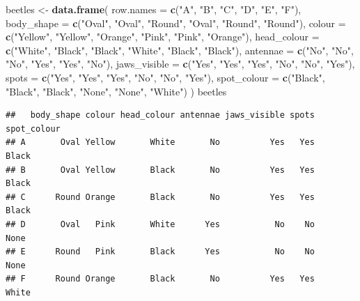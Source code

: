 \documentclass[
  a4paper]{book}
\newenvironment{Shaded}{\begin{snugshade}}{\end{snugshade}}
\newcommand{\AttributeTok}[1]{\textcolor[rgb]{0.13,0.29,0.53}{#1}}
\newcommand{\FunctionTok}[1]{\textcolor[rgb]{0.13,0.29,0.53}{\textbf{#1}}}
\newcommand{\NormalTok}[1]{#1}
\newcommand{\OtherTok}[1]{\textcolor[rgb]{0.56,0.35,0.01}{#1}}
\newcommand{\StringTok}[1]{\textcolor[rgb]{0.31,0.60,0.02}{#1}}
\begin{document}
\begin{Shaded}
\begin{Highlighting}[]
\NormalTok{beetles }\OtherTok{\textless{}{-}} \FunctionTok{data.frame}\NormalTok{(}
  \AttributeTok{row.names    =} \FunctionTok{c}\NormalTok{(}\StringTok{"A"}\NormalTok{, }\StringTok{"B"}\NormalTok{, }\StringTok{"C"}\NormalTok{, }\StringTok{"D"}\NormalTok{, }\StringTok{"E"}\NormalTok{, }\StringTok{"F"}\NormalTok{),}
  \AttributeTok{body\_shape   =} \FunctionTok{c}\NormalTok{(}\StringTok{"Oval"}\NormalTok{, }\StringTok{"Oval"}\NormalTok{, }\StringTok{"Round"}\NormalTok{, }\StringTok{"Oval"}\NormalTok{, }\StringTok{"Round"}\NormalTok{, }\StringTok{"Round"}\NormalTok{),}
  \AttributeTok{colour       =} \FunctionTok{c}\NormalTok{(}\StringTok{"Yellow"}\NormalTok{, }\StringTok{"Yellow"}\NormalTok{, }\StringTok{"Orange"}\NormalTok{, }\StringTok{"Pink"}\NormalTok{, }\StringTok{"Pink"}\NormalTok{, }\StringTok{"Orange"}\NormalTok{),}
  \AttributeTok{head\_colour  =} \FunctionTok{c}\NormalTok{(}\StringTok{"White"}\NormalTok{, }\StringTok{"Black"}\NormalTok{, }\StringTok{"Black"}\NormalTok{, }\StringTok{"White"}\NormalTok{, }\StringTok{"Black"}\NormalTok{, }\StringTok{"Black"}\NormalTok{),}
  \AttributeTok{antennae     =} \FunctionTok{c}\NormalTok{(}\StringTok{"No"}\NormalTok{, }\StringTok{"No"}\NormalTok{, }\StringTok{"No"}\NormalTok{, }\StringTok{"Yes"}\NormalTok{, }\StringTok{"Yes"}\NormalTok{, }\StringTok{"No"}\NormalTok{),}
  \AttributeTok{jaws\_visible =} \FunctionTok{c}\NormalTok{(}\StringTok{"Yes"}\NormalTok{, }\StringTok{"Yes"}\NormalTok{, }\StringTok{"Yes"}\NormalTok{, }\StringTok{"No"}\NormalTok{, }\StringTok{"No"}\NormalTok{, }\StringTok{"Yes"}\NormalTok{),}
  \AttributeTok{spots        =} \FunctionTok{c}\NormalTok{(}\StringTok{"Yes"}\NormalTok{, }\StringTok{"Yes"}\NormalTok{, }\StringTok{"Yes"}\NormalTok{, }\StringTok{"No"}\NormalTok{, }\StringTok{"No"}\NormalTok{, }\StringTok{"Yes"}\NormalTok{),}
  \AttributeTok{spot\_colour  =} \FunctionTok{c}\NormalTok{(}\StringTok{"Black"}\NormalTok{, }\StringTok{"Black"}\NormalTok{, }\StringTok{"Black"}\NormalTok{, }\StringTok{"None"}\NormalTok{, }\StringTok{"None"}\NormalTok{, }\StringTok{"White"}\NormalTok{)}
\NormalTok{)}
\NormalTok{beetles}
\end{Highlighting}
\end{Shaded}

\begin{verbatim}
##   body_shape colour head_colour antennae jaws_visible spots spot_colour
## A       Oval Yellow       White       No          Yes   Yes       Black
## B       Oval Yellow       Black       No          Yes   Yes       Black
## C      Round Orange       Black       No          Yes   Yes       Black
## D       Oval   Pink       White      Yes           No    No        None
## E      Round   Pink       Black      Yes           No    No        None
## F      Round Orange       Black       No          Yes   Yes       White
\end{verbatim}
\end{document}
